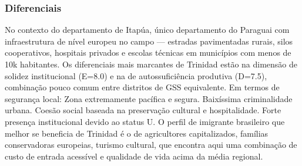 \subsubsection*{Diferenciais}\label{dif-trinidad-0722}
No contexto do departamento de Itapúa, único departamento do Paraguai com infraestrutura de nível europeu no campo — estradas pavimentadas rurais, silos cooperativos, hospitais privados e escolas técnicas em municípios com menos de 10k habitantes. Os diferenciais mais marcantes de Trinidad estão na dimensão de solidez institucional (E=8.0) e na de autossuficiência produtiva (D=7.5), combinação pouco comum entre distritos de GSS equivalente. Em termos de segurança local: Zona extremamente pacífica e segura. Baixíssima criminalidade urbana. Coesão social baseada na preservação cultural e hospitalidade. Forte presença institucional devido ao status U. O perfil de imigrante brasileiro que melhor se beneficia de Trinidad é o de agricultores capitalizados, famílias conservadoras europeias, turismo cultural, que encontra aqui uma combinação de custo de entrada acessível e qualidade de vida acima da média regional.

